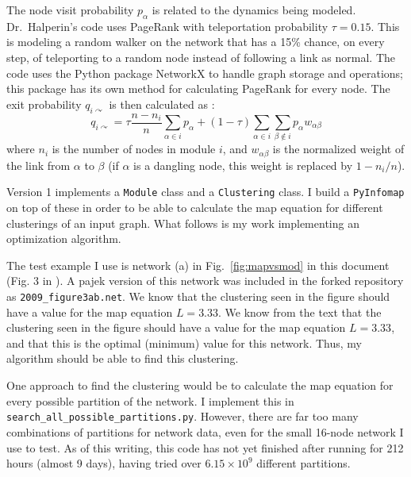 The node visit probability \(p_{\alpha}\) is related to the dynamics
being modeled. Dr.~Halperin's code uses PageRank with teleportation
probability \(\tau = 0.15\). This is modeling a random walker on the
network that has a 15\% chance, on every step, of teleporting to a
random node instead of following a link as normal. The code uses the
Python package NetworkX \autocite{hagberg_exploring_2008} to handle
graph storage and operations; this package has its own method for
calculating PageRank for every node. The exit probability
\(q_{i\curvearrowright}\) is then calculated as
\autocite{rosvall_map_2010}:
\[q_{i\curvearrowright} = \tau \frac{n-n_i}{n} \sum_{\alpha \in i}{p_{\alpha}} + (1-\tau) \sum_{\alpha \in i}{\sum_{\beta \notin i}{p_{\alpha}w_{\alpha \beta}}}\]
where \(n_i\) is the number of nodes in module \(i\), and
\(w_{\alpha \beta}\) is the normalized weight of the link from
\(\alpha\) to \(\beta\) (if \(\alpha\) is a dangling node, this weight
is replaced by \(1-n_i/n\)).

Version 1 implements a \texttt{Module} class and a \texttt{Clustering}
class. I build a \texttt{PyInfomap} on top of these in order to be able
to calculate the map equation for different clusterings of an input
graph. What follows is my work implementing an optimization algorithm.

The test example I use is network (a) in Fig.~\ref{fig:mapvsmod} in this
document (Fig. 3 in \autocite{rosvall_map_2010}). A pajek version of
this network was included in the forked repository as
\texttt{2009\_figure3ab.net}. We know that the clustering seen in the
figure should have a value for the map equation \(L = 3.33\). We know
from the text that the clustering seen in the figure should have a value
for the map equation \(L = 3.33\), and that this is the optimal
(minimum) value for this network. Thus, my algorithm should be able to
find this clustering.

One approach to find the clustering would be to calculate the map
equation for every possible partition of the network. I implement this
in \texttt{search\_all\_possible\_partitions.py}. However, there are far
too many combinations of partitions for network data, even for the small
16-node network I use to test. As of this writing, this code has not yet
finished after running for 212 hours (almost 9 days), having tried over
\(6.15 \times 10^9\) different partitions.

